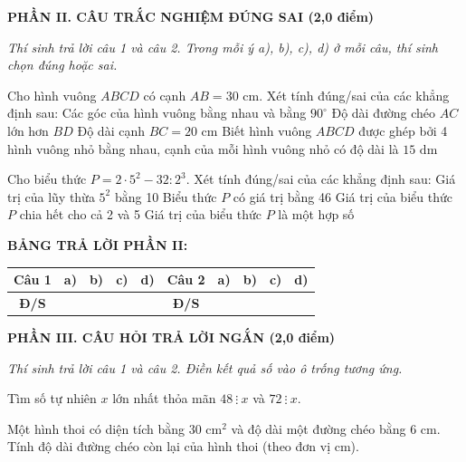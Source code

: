 \documentclass[12pt,a4paper]{article}
\begin{document}
\setcounter{ex}{0}
\noindent\textbf{\large PHẦN II. CÂU TRẮC NGHIỆM ĐÚNG SAI (2,0 điểm)}

\textit{Thí sinh trả lời câu 1 và câu 2. Trong mỗi ý a), b), c), d) ở mỗi câu, thí sinh chọn đúng hoặc sai.}

\vspace{1mm}
\begin{ex}
Cho hình vuông $ABCD$ có cạnh $AB = 30\text{ cm}$. Xét tính đúng/sai của các khẳng định sau:
\choiceTF
{\True Các góc của hình vuông bằng nhau và bằng $90^\circ$}
{Độ dài đường chéo $AC$ lớn hơn $BD$}
{Độ dài cạnh $BC = 20\text{ cm}$}
{Biết hình vuông $ABCD$ được ghép bởi 4 hình vuông nhỏ bằng nhau, cạnh của mỗi hình vuông nhỏ có độ dài là $15\text{ dm}$}
\end{ex}

\begin{ex}
Cho biểu thức $P = 2 \cdot 5^2 - 32 : 2^3$. Xét tính đúng/sai của các khẳng định sau:
\choiceTF
{Giá trị của lũy thừa $5^2$ bằng 10}
{\True Biểu thức $P$ có giá trị bằng 46}
{Giá trị của biểu thức $P$ chia hết cho cả 2 và 5}
{\True Giá trị của biểu thức $P$ là một hợp số}
\end{ex}


\noindent\textbf{BẢNG TRẢ LỜI PHẦN II:}
\begin{center}
\begin{tabular}{|c|c|c|c|c||c|c|c|c|c|}
\hline
\textbf{Câu 1} & \textbf{a)} & \textbf{b)} & \textbf{c)} & \textbf{d)} & \textbf{Câu 2} & \textbf{a)} & \textbf{b)} & \textbf{c)} & \textbf{d)} \\
\hline
\textbf{Đ/S} & \rule{0pt}{0.6cm} & & & & \textbf{Đ/S} & & & & \\
\hline
\end{tabular}
\end{center}
\vspace{2mm}

\setcounter{ex}{0}
\noindent\textbf{\large PHẦN III. CÂU HỎI TRẢ LỜI NGẮN (2,0 điểm)}

\textit{Thí sinh trả lời câu 1 và câu 2. Điền kết quả số vào ô trống tương ứng.}

\vspace{1mm}
\begin{ex}
Tìm số tự nhiên $x$ lớn nhất thỏa mãn $48 \ \vdots \ x$ và $72 \ \vdots \ x$. 
\end{ex}

\begin{ex}
Một hình thoi có diện tích bằng $30\text{ cm}^2$ và độ dài một đường chéo bằng $6\text{ cm}$. Tính độ dài đường chéo còn lại của hình thoi (theo đơn vị $\text{cm}$). 
\end{ex}
\end{document}
